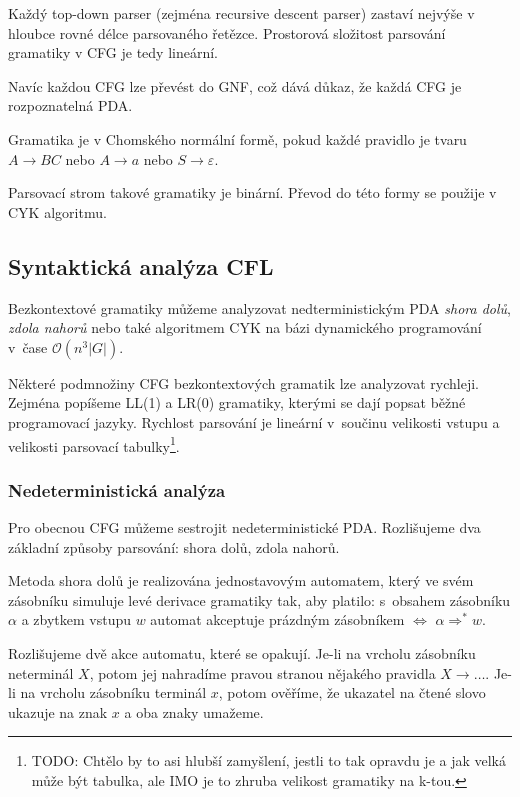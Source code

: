 Každý top-down parser (zejména recursive descent parser)
zastaví nejvýše v hloubce rovné délce parsovaného řetězce. Prostorová
složitost parsování gramatiky v CFG je tedy lineární.

Navíc každou CFG lze převést do GNF, což dává důkaz, že každá CFG je
rozpoznatelná PDA.

\begin{definition}
    Gramatika je v Chomského normální formě, pokud každé pravidlo je
    tvaru $A \to BC$ nebo $A \to a$ nebo $S \to \varepsilon$.
\end{definition}

Parsovací strom takové gramatiky je binární. Převod do této formy se
použije v CYK algoritmu.


\subsection{Syntaktická analýza CFL}

Bezkontextové gramatiky můžeme analyzovat nedterministickým PDA
{\em shora dolů}, {\em zdola nahorů} nebo také algoritmem CYK na bázi
dynamického programování v~čase $\mathcal{O}(n^3 \lvert G \rvert)$.

Některé podmnožiny CFG bezkontextových gramatik lze analyzovat rychleji.
Zejména popíšeme LL(1) a LR(0) gramatiky, kterými se dají popsat běžné
programovací jazyky. Rychlost parsování je lineární v~součinu velikosti
vstupu a velikosti parsovací tabulky\footnote{TODO: Chtělo by to asi hlubší
zamyšlení, jestli to tak opravdu je a jak velká může být tabulka, ale
IMO je to zhruba velikost gramatiky na k-tou.}.

\subsubsection{Nedeterministická analýza}

Pro obecnou CFG můžeme sestrojit nedeterministické PDA. Rozlišujeme dva
základní způsoby parsování: shora dolů, zdola nahorů.

Metoda shora dolů je realizována jednostavovým automatem, který ve svém
zásobníku simuluje levé derivace gramatiky tak, aby platilo:
s~obsahem zásobníku $\alpha$ a zbytkem vstupu $w$ automat akceptuje
prázdným zásobníkem $\iff$ $\alpha \Rightarrow^* w$.

Rozlišujeme dvě akce automatu, které se opakují.
Je-li na vrcholu zásobníku neterminál
$X$, potom jej nahradíme pravou stranou nějakého pravidla $X \to
\ldots$. Je-li na vrcholu zásobníku terminál $x$, potom ověříme,
že ukazatel na čtené slovo ukazuje na znak $x$ a oba znaky umažeme.

